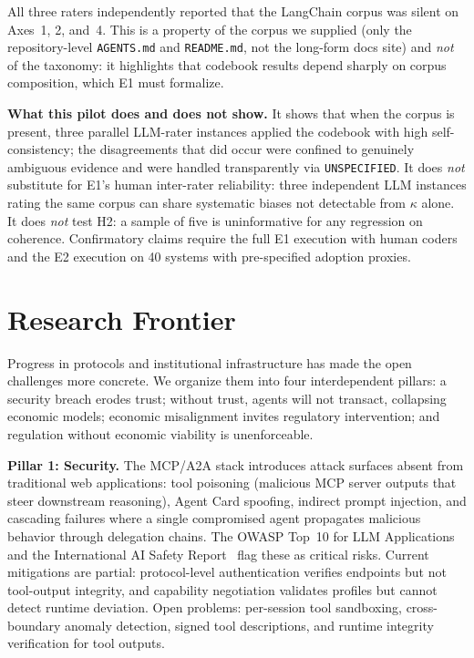 \documentclass{IEEEcsmag}
\begin{document}
All three raters independently reported that the LangChain corpus was silent on Axes~1, 2, and~4.  This is a property of the corpus we supplied (only the repository-level \texttt{AGENTS.md} and \texttt{README.md}, not the long-form docs site) and \emph{not} of the taxonomy: it highlights that codebook results depend sharply on corpus composition, which E1 must formalize.

\textbf{What this pilot does and does not show.}  It shows that when the corpus is present, three parallel LLM-rater instances applied the codebook with high self-consistency; the disagreements that did occur were confined to genuinely ambiguous evidence and were handled transparently via \texttt{UNSPECIFIED}.  It does \emph{not} substitute for E1's human inter-rater reliability: three independent LLM instances rating the same corpus can share systematic biases not detectable from $\kappa$ alone.  It does \emph{not} test H2: a sample of five is uninformative for any regression on coherence.  Confirmatory claims require the full E1 execution with human coders and the E2 execution on 40 systems with pre-specified adoption proxies.


\section{Research Frontier}\label{sec:frontier}

Progress in protocols and institutional infrastructure has made the open challenges more concrete. We organize them into four interdependent pillars: a security breach erodes trust; without trust, agents will not transact, collapsing economic models; economic misalignment invites regulatory intervention; and regulation without economic viability is unenforceable.

\textbf{Pillar 1: Security.}  The MCP/A2A stack introduces attack surfaces absent from traditional web applications: tool poisoning (malicious MCP server outputs that steer downstream reasoning), Agent Card spoofing, indirect prompt injection, and cascading failures where a single compromised agent propagates malicious behavior through delegation chains.  The OWASP Top~10 for LLM Applications~\cite{OWASP_LLM_2025} and the International AI Safety Report~\cite{AISAFETY_2025} flag these as critical risks.  Current mitigations are partial: protocol-level authentication verifies endpoints but not tool-output integrity, and capability negotiation validates profiles but cannot detect runtime deviation.  Open problems: per-session tool sandboxing, cross-boundary anomaly detection, signed tool descriptions, and runtime integrity verification for tool outputs.
\end{document}
